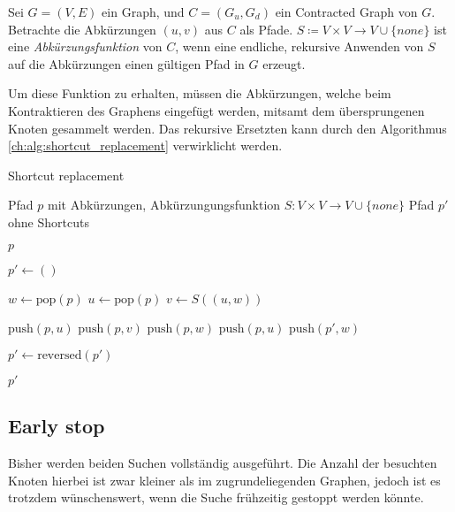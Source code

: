 \begin{definition}[Abkürzungsfunktion]
    Sei $G = (V, E)$ ein Graph, und $C = (G_u, G_d)$ ein Contracted Graph von $G$.
    Betrachte die Abkürzungen $(u, v)$ aus $C$ als Pfade.
    $S \coloneq V \times V \to V \cup \{ {none} \}$ ist eine \emph{Abkürzungsfunktion} von $C$, wenn eine endliche, rekursive Anwenden von $S$ auf die Abkürzungen einen gültigen Pfad in $G$ erzeugt.
\end{definition}

Um diese Funktion zu erhalten, müssen die Abkürzungen, welche beim Kontraktieren des Graphens eingefügt werden, mitsamt dem übersprungenen Knoten gesammelt werden.
Das rekursive Ersetzten kann durch den Algorithmus \ref{ch:alg:shortcut_replacement} verwirklicht werden.

\begin{algorithm}[ht]
    \caption{Shortcut replacement}
    \begin{algorithmic}[1]
        \Require Pfad $p$ mit Abkürzungen, Abkürzungungsfunktion $S \colon V \times V \to V \cup \{ {none} \}$
        \Ensure Pfad $p'$ ohne Shortcuts

        \State \Return $p$
        \EndIf
        \State

        \State $p' \leftarrow ()$
        \State

        \State $w \leftarrow \text{pop}(p)$
        \State $u \leftarrow \text{pop}(p)$
        \State $v \leftarrow S((u, w))$
        \State

        \State $\text{push}(p, u)$
        \State $\text{push}(p, v)$
        \State $\text{push}(p, w)$
        \Else
        \State $\text{push}(p, u)$
        \State $\text{push}(p', w)$
        \EndIf
        \EndWhile

        \State
        \State $p' \leftarrow \text{reversed}(p')$

        \State
        \State \Return $p'$
    \end{algorithmic}
    \label{ch:alg:shortcut_replacement}
\end{algorithm}

\subsection{Early stop}

Bisher werden beiden Suchen vollständig ausgeführt.
Die Anzahl der besuchten Knoten hierbei ist zwar kleiner als im zugrundeliegenden Graphen, jedoch ist es trotzdem wünschenswert, wenn die Suche frühzeitig gestoppt werden könnte.

